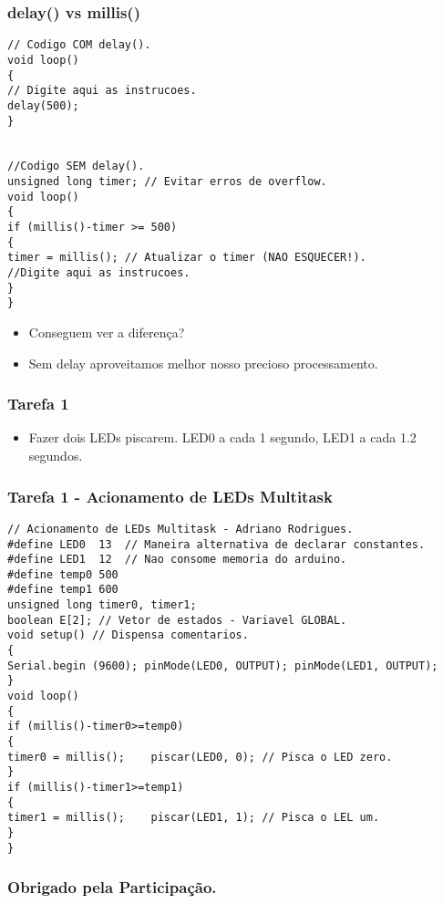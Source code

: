 \documentclass{beamer}
\begin{document}
\begin{frame}[fragile]
	\frametitle{\textbf{delay()} vs \textbf{millis()}}
\begin{lstlisting}[style=Arduino,basicstyle=\scriptsize \ttfamily]
// Codigo COM delay().
void loop()
{
// Digite aqui as instrucoes.
delay(500);
}


//Codigo SEM delay().
unsigned long timer; // Evitar erros de overflow.
void loop()
{
if (millis()-timer >= 500)
{
timer = millis(); // Atualizar o timer (NAO ESQUECER!).
//Digite aqui as instrucoes.
}
}
\end{lstlisting}
	\begin{itemize}
	\item<1-> Conseguem ver a diferença?
	\item<2-> Sem delay aproveitamos melhor nosso precioso processamento.
	\end{itemize}
\end{frame}

\begin{frame}
	\frametitle{Tarefa 1}
	\begin{itemize}
	\item Fazer dois LEDs piscarem. LED0 a cada 1 segundo, LED1 a cada 1.2 segundos.
	\end{itemize}
\end{frame}

\begin{frame}[fragile]
	\frametitle{Tarefa 1 - Acionamento de LEDs Multitask}
	\begin{lstlisting}[style=Arduino,basicstyle=\scriptsize \ttfamily]
// Acionamento de LEDs Multitask - Adriano Rodrigues.
#define LED0  13  // Maneira alternativa de declarar constantes.
#define LED1  12  // Nao consome memoria do arduino.
#define temp0 500
#define temp1 600
unsigned long timer0, timer1;
boolean E[2]; // Vetor de estados - Variavel GLOBAL.
void setup() // Dispensa comentarios.
{
Serial.begin (9600); pinMode(LED0, OUTPUT); pinMode(LED1, OUTPUT);
}
void loop()
{
if (millis()-timer0>=temp0)
{
timer0 = millis();    piscar(LED0, 0); // Pisca o LED zero.
}
if (millis()-timer1>=temp1)
{
timer1 = millis();    piscar(LED1, 1); // Pisca o LEL um.
}
}
\end{lstlisting}
\end{frame}

\begin{frame}
	\frametitle{Obrigado pela Participação.}
	\titlepage
\end{frame}
\end{document}
